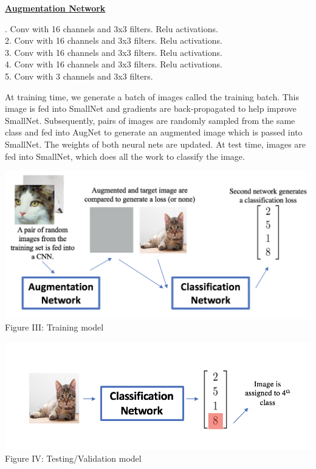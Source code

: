 \documentclass[10pt,twocolumn,letterpaper]{article}
\begin{document}
\begin{center}
\underline{\textbf{Augmentation Network}}

. Conv with 16 channels and 3x3 filters. Relu activations. \\
2. Conv with 16 channels and 3x3 filters. Relu activations. \\
3. Conv with 16 channels and 3x3 filters. Relu activations. \\
4. Conv with 16 channels and 3x3 filters. Relu activations. \\
5. Conv with 3 channels and 3x3 filters. \\
\end{center}

At training time, we generate a batch of images called the training batch. This image is fed into SmallNet and gradients are back-propagated to help improve SmallNet. Subsequently, pairs of images are randomly sampled from the same class and fed into AugNet to generate an augmented image which is passed into SmallNet. The weights of both neural nets are updated. At test time, images are fed into SmallNet, which does all the work to classify the image. 

\begin{center}
\includegraphics[scale=0.41]{trainModel.png}
Figure III: Training model 
\end{center}

\begin{center}
\includegraphics[scale=0.48]{testModel.png}
Figure IV: Testing/Validation model 
\end{center}
\end{document}
